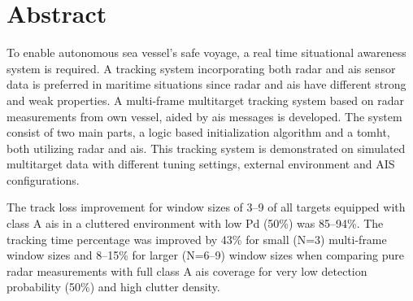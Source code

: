 
\section*{\huge Abstract}
\hfill
\noindent

To enable autonomous sea vessel's safe voyage, a real time situational awareness system is required. A tracking system incorporating both radar and \gls{ais} sensor data is preferred in maritime situations since radar and \gls{ais} have different strong and weak properties. A multi-frame multitarget tracking system based on radar \glspl{measurement} from own vessel, aided by \gls{ais} messages is developed. The system consist of two main parts, a logic based initialization algorithm and a \gls{tomht}, both utilizing radar and \gls{ais}. This tracking system is demonstrated on simulated multitarget data with different tuning settings, external environment and AIS configurations.

The track loss improvement for window sizes of 3--9 of all targets equipped with class A \gls{ais} in a cluttered environment with low \gls{Pd} (50\%) was 85--94\%. The tracking time percentage was improved by 43\% for small (N=3) multi-frame window sizes and 8--15\% for larger (N=6--9) window sizes when comparing pure radar measurements with full class A \gls{ais} coverage for very low detection probability (50\%) and high clutter density.